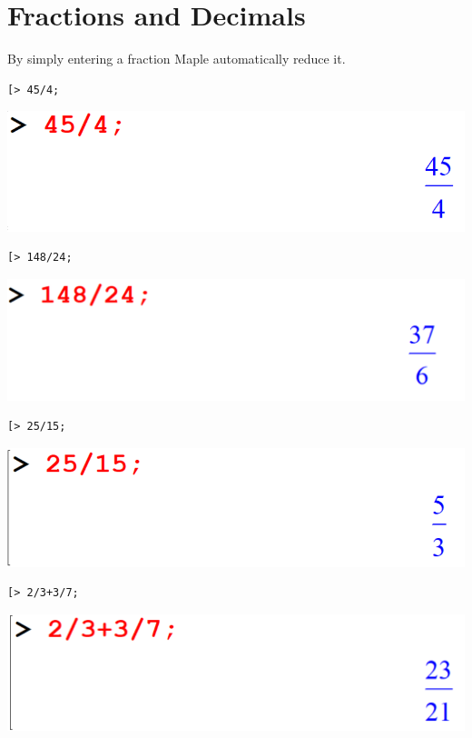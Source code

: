 \documentclass[
]{book}
\theoremstyle{definition}
\theoremstyle{definition}
\theoremstyle{definition}
\theoremstyle{definition}
\theoremstyle{remark}
\begin{document}
\section{Fractions and Decimals}\label{fractions-and-decimals-1}

By simply entering a fraction Maple automatically reduce it.

\begin{verbatim}
[> 45/4;
\end{verbatim}

\includegraphics{figures/Lesson 1/fig19.png}

\begin{verbatim}
[> 148/24;
\end{verbatim}

\includegraphics{figures/Lesson 1/fig20.png}

\begin{verbatim}
[> 25/15;
\end{verbatim}

\includegraphics{figures/Lesson 1/fig21.png}

\begin{verbatim}
[> 2/3+3/7;
\end{verbatim}

\includegraphics{figures/Lesson 1/fig22.png}
\end{document}
